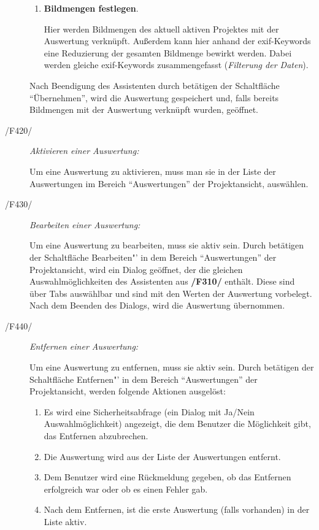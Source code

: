 \begin{description}
\begin{enumerate}
				\item \textbf{Bildmengen festlegen}.\par Hier werden Bildmengen des aktuell aktiven Projektes mit der Auswertung verknüpft. Außerdem kann hier anhand der \gls{exif}-Keywords eine Reduzierung der gesamten Bildmenge bewirkt werden. Dabei werden gleiche \gls{exif}-Keywords zusammengefasst (\textit{Filterung der Daten}).

			\end{enumerate}

			Nach Beendigung des Assistenten durch betätigen der Schaltfläche "`Übernehmen"', wird die Auswertung gespeichert und, falls bereits Bildmengen mit der Auswertung verknüpft wurden, geöffnet.
		
		\item[/F420/] \textit{Aktivieren einer Auswertung:}\par Um eine Auswertung zu aktivieren, muss man sie in der Liste der Auswertungen im Bereich "`Auswertungen"' der Projektansicht, auswählen.
		
		\item[/F430/] \textit{Bearbeiten einer Auswertung:}\par Um eine Auswertung zu bearbeiten, muss sie aktiv sein. Durch betätigen der Schaltfläche Bearbeiten"' in dem Bereich "`Auswertungen"' der Projektansicht, wird ein Dialog geöffnet, der die gleichen Auswahlmöglichkeiten des Assistenten aus \textbf{/F310/} enthält. Diese sind über Tabs auswählbar und sind mit den Werten der Auswertung vorbelegt. Nach dem Beenden des Dialogs, wird die Auswertung übernommen.
				
		\item[/F440/] \textit{Entfernen einer Auswertung:}\par Um eine Auswertung zu entfernen, muss sie aktiv sein. Durch betätigen der Schaltfläche Entfernen"' in dem Bereich "`Auswertungen"' der Projektansicht, werden folgende Aktionen ausgelöst:

			\begin{enumerate}

				\item Es wird eine Sicherheitsabfrage (ein Dialog mit Ja/Nein Auswahlmöglichkeit) angezeigt, die dem Benutzer die Möglichkeit gibt, das Entfernen abzubrechen.

				\item Die Auswertung wird aus der Liste der Auswertungen entfernt.

				\item Dem Benutzer wird eine Rückmeldung gegeben, ob das Entfernen erfolgreich war oder ob es einen Fehler gab.

				\item Nach dem Entfernen, ist die erste Auswertung (falls vorhanden) in der Liste aktiv.

			\end{enumerate}
			
	\end{description}

